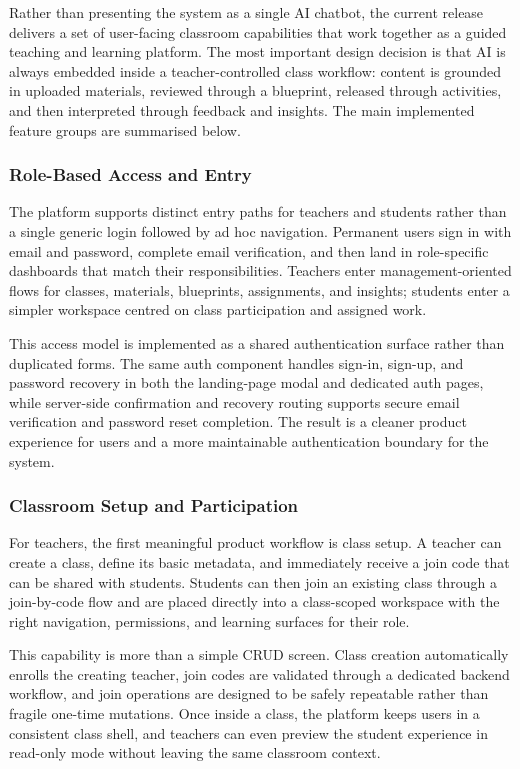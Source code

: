 \documentclass[11pt,a4paper]{article}
\begin{document}
Rather than presenting the system as a single AI chatbot, the current release delivers a set of
user-facing classroom capabilities that work together as a guided teaching and learning platform.
The most important design decision is that AI is always embedded inside a teacher-controlled class
workflow: content is grounded in uploaded materials, reviewed through a blueprint, released through
activities, and then interpreted through feedback and insights. The main implemented feature groups
are summarised below.

\subsubsection*{Role-Based Access and Entry}

The platform supports distinct entry paths for teachers and students rather than a single generic
login followed by ad hoc navigation. Permanent users sign in with email and password, complete
email verification, and then land in role-specific dashboards that match their responsibilities.
Teachers enter management-oriented flows for classes, materials, blueprints, assignments, and
insights; students enter a simpler workspace centred on class participation and assigned work.

This access model is implemented as a shared authentication surface rather than duplicated forms.
The same auth component handles sign-in, sign-up, and password recovery in both the landing-page
modal and dedicated auth pages, while server-side confirmation and recovery routing supports secure
email verification and password reset completion. The result is a cleaner product experience for
users and a more maintainable authentication boundary for the system.

\subsubsection*{Classroom Setup and Participation}

For teachers, the first meaningful product workflow is class setup. A teacher can create a class,
define its basic metadata, and immediately receive a join code that can be shared with students.
Students can then join an existing class through a join-by-code flow and are placed directly into a
class-scoped workspace with the right navigation, permissions, and learning surfaces for their
role.

This capability is more than a simple CRUD screen. Class creation automatically enrolls the
creating teacher, join codes are validated through a dedicated backend workflow, and join operations
are designed to be safely repeatable rather than fragile one-time mutations. Once inside a class,
the platform keeps users in a consistent class shell, and teachers can even preview the student
experience in read-only mode without leaving the same classroom context.
\end{document}
